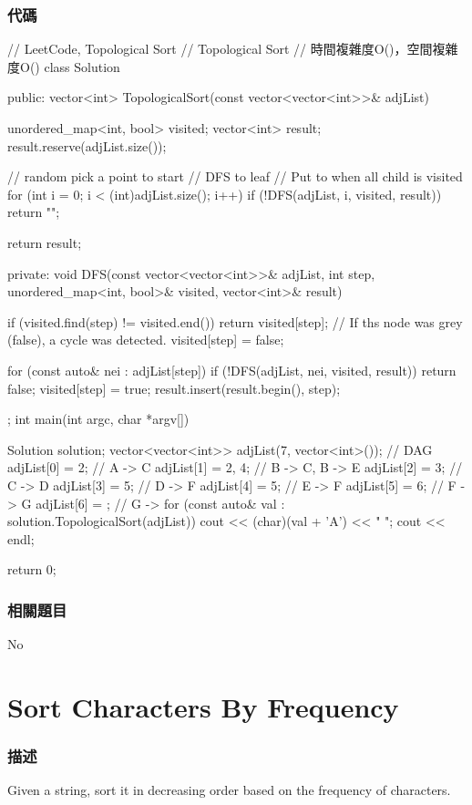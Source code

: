 \subsubsection{代碼}
\begin{Code}
// LeetCode, Topological Sort
// Topological Sort
// 時間複雜度O()，空間複雜度O()
class Solution {
public:
    vector<int> TopologicalSort(const vector<vector<int>>& adjList) {
        unordered_map<int, bool> visited;
        vector<int> result; result.reserve(adjList.size());

        // random pick a point to start
        // DFS to leaf
        // Put to when all child is visited
        for (int i = 0; i < (int)adjList.size(); i++) {
            if (!DFS(adjList, i, visited, result)) return "";
        }

        return result;
    }
private:
    void DFS(const vector<vector<int>>& adjList, int step, unordered_map<int, bool>& visited, vector<int>& result) {
        if (visited.find(step) != visited.end())
            return visited[step]; // If ths node was grey (false), a cycle was detected.
        visited[step] = false;

        for (const auto& nei : adjList[step]) {
            if (!DFS(adjList, nei, visited, result)) return false;
        }
        visited[step] = true;
        result.insert(result.begin(), step);
    }
};
int main(int argc, char *argv[]) {
    Solution solution;
    vector<vector<int>> adjList(7, vector<int>()); // DAG
    adjList[0] = {2}; // A -> C
    adjList[1] = {2, 4}; // B -> C, B -> E
    adjList[2] = {3}; // C -> D
    adjList[3] = {5}; // D -> F
    adjList[4] = {5}; // E -> F
    adjList[5] = {6}; // F -> G
    adjList[6] = {}; // G ->
    for (const auto& val : solution.TopologicalSort(adjList))
        cout << (char)(val + 'A') << " ";
    cout << endl;

    return 0;
}
\end{Code}

\subsubsection{相關題目}
No

\section{Sort Characters By Frequency} %
\label{sec:sort-character-by-frequency}


\subsubsection{描述}
Given a string, sort it in decreasing order based on the frequency of characters.

